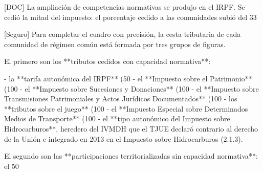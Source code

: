 \documentclass[10pt,a4paper]{article}
\begin{document}
[DOC] La ampliación de competencias normativas se produjo en el IRPF. Se cedió la mitad del impuesto: el porcentaje cedido a las comunidades subió del 33%

[Seguro] Para completar el cuadro con precisión, la cesta tributaria de cada comunidad de régimen común está formada por tres grupos de figuras.

El primero son los **tributos cedidos con capacidad normativa**:

- la **tarifa autonómica del IRPF** (50%
- el **Impuesto sobre el Patrimonio** (100%
- el **Impuesto sobre Sucesiones y Donaciones** (100%
- el **Impuesto sobre Transmisiones Patrimoniales y Actos Jurídicos Documentados** (100%
- los **tributos sobre el juego** (100%
- el **Impuesto Especial sobre Determinados Medios de Transporte** (100%
- el **tipo autonómico del Impuesto sobre Hidrocarburos**, heredero del IVMDH que el TJUE declaró contrario al derecho de la Unión e integrado en 2013 en el Impuesto sobre Hidrocarburos (2.1.3).

El segundo son las **participaciones territorializadas sin capacidad normativa**: el 50%
\end{document}
